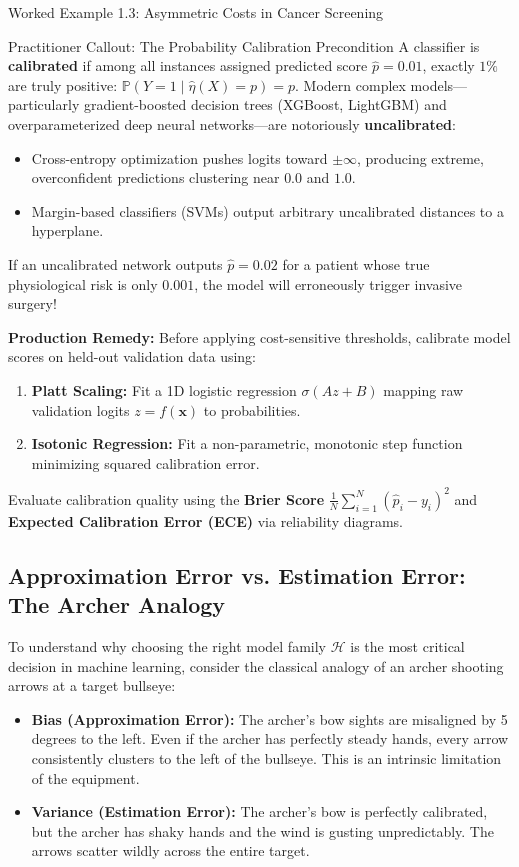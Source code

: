 \begin{examplebox}{Worked Example 1.3: Asymmetric Costs in Cancer Screening}
\begin{intuitionbox}{Practitioner Callout: The Probability Calibration Precondition}
A classifier is \textbf{calibrated} if among all instances assigned predicted score $\hat{p} = 0.01$, exactly $1\%$ are truly positive: $\mathbb{P}(Y = 1 \mid \hat{\eta}(X) = p) = p$.
Modern complex models—particularly gradient-boosted decision trees (XGBoost, LightGBM) and overparameterized deep neural networks—are notoriously \textbf{uncalibrated}:
\begin{itemize}
    \item Cross-entropy optimization pushes logits toward $\pm \infty$, producing extreme, overconfident predictions clustering near $0.0$ and $1.0$.
    \item Margin-based classifiers (SVMs) output arbitrary uncalibrated distances to a hyperplane.
\end{itemize}
If an uncalibrated network outputs $\hat{p} = 0.02$ for a patient whose true physiological risk is only $0.001$, the model will erroneously trigger invasive surgery! 

\textbf{Production Remedy:} Before applying cost-sensitive thresholds, calibrate model scores on held-out validation data using:
\begin{enumerate}
    \item \textbf{Platt Scaling:} Fit a 1D logistic regression $\sigma(A z + B)$ mapping raw validation logits $z = f(\mathbf{x})$ to probabilities.
    \item \textbf{Isotonic Regression:} Fit a non-parametric, monotonic step function minimizing squared calibration error.
\end{enumerate}
Evaluate calibration quality using the \textbf{Brier Score} $\frac{1}{N}\sum_{i=1}^N (\hat{p}_i - y_i)^2$ and \textbf{Expected Calibration Error (ECE)} via reliability diagrams.
\end{intuitionbox}
\end{examplebox}

\subsection{Approximation Error vs. Estimation Error: The Archer Analogy}
To understand why choosing the right model family $\mathcal{H}$ is the most critical decision in machine learning, consider the classical analogy of an archer shooting arrows at a target bullseye:
\begin{itemize}
    \item \textbf{Bias (Approximation Error):} The archer's bow sights are misaligned by 5 degrees to the left. Even if the archer has perfectly steady hands, every arrow consistently clusters to the left of the bullseye. This is an intrinsic limitation of the equipment.
    \item \textbf{Variance (Estimation Error):} The archer's bow is perfectly calibrated, but the archer has shaky hands and the wind is gusting unpredictably. The arrows scatter wildly across the entire target.
\end{itemize}

